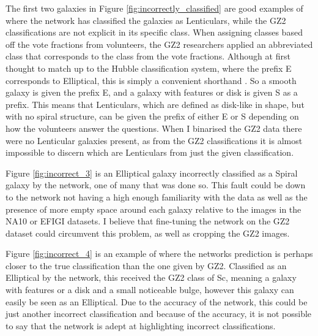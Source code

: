 \documentclass[12pt, onecolumn]{aa}
\begin{document}
The first two galaxies in Figure \ref{fig:incorrectly_classified} are good examples of where the network has classified the galaxies as Lenticulars, while the GZ2 classifications are not explicit in its specific class. When assigning classes based off the vote fractions from volunteers, the GZ2 researchers applied an abbreviated class that corresponds to the class from the vote fractions. Although at first thought to match up to the Hubble classification system, where the prefix E corresponds to Elliptical, this is simply a convenient shorthand \citep{Willett2013}. So a smooth galaxy is given the prefix E, and a galaxy with features or disk is given S as a prefix. This means that Lenticulars, which are defined as disk-like in shape, but with no spiral structure, can be given the prefix of either E or S depending on how the volunteers answer the questions. When I binarised the GZ2 data there were no Lenticular galaxies present, as from the GZ2 classifications it is almost impossible to discern which are Lenticulars from just the given classification. 

Figure \ref{fig:incorrect_3} is an Elliptical galaxy incorrectly classified as a Spiral galaxy by the network, one of many that was done so. This fault could be down to the network not having a high enough familiarity with the data as well as the presence of more empty space around each galaxy relative to the images in the NA10 or EFIGI datasets. I believe that fine-tuning the network on the GZ2 dataset could circumvent this problem, as well as cropping the GZ2 images. 

Figure \ref{fig:incorrect_4} is an example of where the networks prediction is perhaps closer to the true classification than the one given by GZ2. Classified as an Elliptical by the network, this received the GZ2 class of Sc, meaning a galaxy with features or a disk and a small noticeable bulge, however this galaxy can easily be seen as an Elliptical. Due to the accuracy of the network, this could be just another incorrect classification and because of the accuracy, it is not possible to say that the network is adept at highlighting incorrect classifications.
\end{document}
